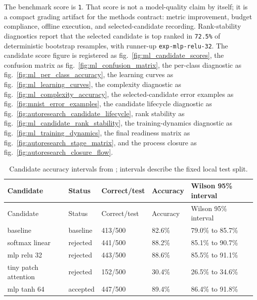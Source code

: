 \documentclass[
]{article}
\begin{document}
The benchmark score is \texttt{1}. That score is not a model-quality
claim by itself; it is a compact grading artifact for the methods
contract: metric improvement, budget compliance, offline execution, and
selected-candidate recording. Rank-stability diagnostics report that the
selected candidate is top ranked in \texttt{72.5\%} of deterministic
bootstrap resamples, with runner-up \texttt{exp-mlp-relu-32}. The
candidate score figure is registered as
fig.~\ref{fig:ml_candidate_scores}, the confusion matrix as
fig.~\ref{fig:ml_confusion_matrix}, the per-class diagnostic as
fig.~\ref{fig:ml_per_class_accuracy}, the learning curves as
fig.~\ref{fig:ml_learning_curves}, the complexity diagnostic as
fig.~\ref{fig:ml_complexity_accuracy}, the selected-candidate error
examples as fig.~\ref{fig:mnist_error_examples}, the candidate lifecycle
diagnostic as fig.~\ref{fig:autoresearch_candidate_lifecycle}, rank
stability as fig.~\ref{fig:ml_candidate_rank_stability}, the
training-dynamics diagnostic as fig.~\ref{fig:ml_training_dynamics}, the
final readiness matrix as fig.~\ref{fig:autoresearch_stage_matrix}, and
the process closure as fig.~\ref{fig:autoresearch_closure_flow}.

\begin{longtable}[]{@{}lllll@{}}
\caption{Candidate accuracy intervals from
\protect{}; intervals
describe the fixed local test
split.}\label{tbl:candidate-intervals}\tabularnewline
\toprule\noalign{}
Candidate & Status & Correct/test & Accuracy & Wilson 95\% interval \\
\midrule\noalign{}
\endfirsthead
\toprule\noalign{}
Candidate & Status & Correct/test & Accuracy & Wilson 95\% interval \\
\midrule\noalign{}
\endhead
\bottomrule\noalign{}
\endlastfoot
baseline & baseline & 413/500 & 82.6\% & 79.0\% to 85.7\% \\
softmax linear & rejected & 441/500 & 88.2\% & 85.1\% to 90.7\% \\
mlp relu 32 & rejected & 443/500 & 88.6\% & 85.5\% to 91.1\% \\
tiny patch attention & rejected & 152/500 & 30.4\% & 26.5\% to 34.6\% \\
mlp tanh 64 & accepted & 447/500 & 89.4\% & 86.4\% to 91.8\% \\
\end{longtable}
\end{document}
